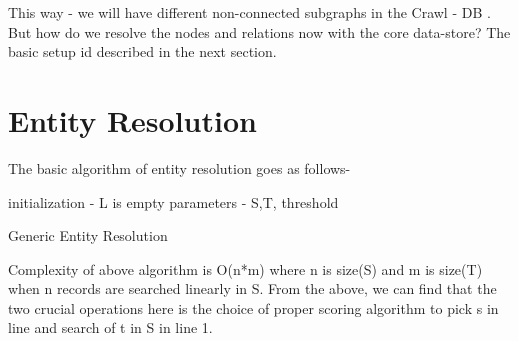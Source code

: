 This way - we will have different non-connected subgraphs in the Crawl - DB .  
But how do we resolve the nodes and relations now with the core data-store? The basic setup id described in the next section. 

\section{Entity Resolution}
\label{dataer}

The basic algorithm of entity resolution goes as follows-

\begin{algorithm}[H]
initialization - L is empty \;
parameters - S,T, threshold \;
 \caption{Generic Entity Resolution}
\end{algorithm}

Complexity of above algorithm is O(n*m) where n is size(S) and m is size(T) when n records are searched linearly in S.
        From the above, we can find that the two crucial operations here is the choice of proper scoring algorithm to pick s in line and search of t in S in line 1.

